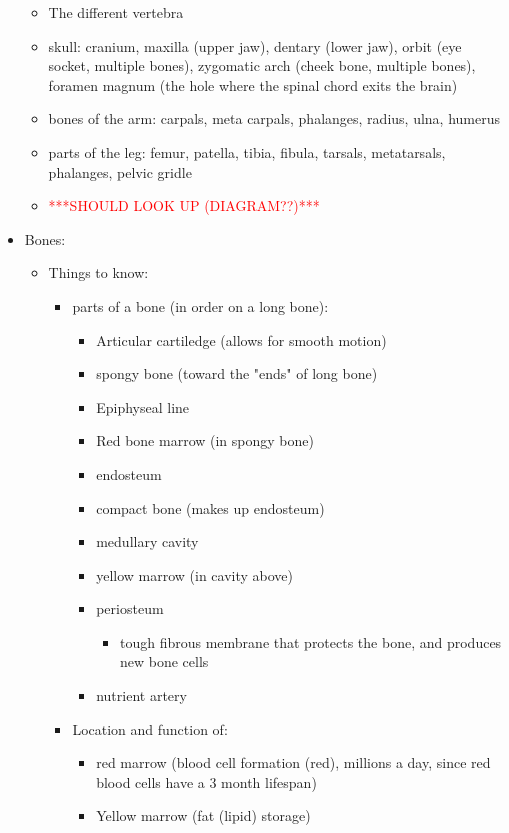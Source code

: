 \documentclass{article}
\theoremstyle{definition}
\begin{document}
\begin{itemize}
\begin{itemize}
			\item The different vertebra
			\item skull: cranium, maxilla (upper jaw), dentary (lower jaw), orbit (eye socket, multiple bones), zygomatic arch (cheek bone, multiple bones), foramen magnum (the hole where the spinal chord exits the brain)
			\item bones of the arm: carpals, meta carpals, phalanges, radius, ulna, humerus
			\item parts of the leg: femur, patella, tibia, fibula, tarsals, metatarsals, phalanges, pelvic gridle
			\item \textcolor{red}{***SHOULD LOOK UP (DIAGRAM??)***}
		\end{itemize}
	\item Bones:
		\begin{itemize}
			\item Things to know:
				\begin{itemize}
					\item parts of a bone (in order on a long bone):
						\begin{itemize}
							\item Articular cartiledge (allows for smooth motion)
							\item spongy bone (toward the "ends" of long bone)
							\item Epiphyseal line
							\item Red bone marrow (in spongy bone)
							\item endosteum
							\item compact bone (makes up endosteum)
							\item medullary cavity
							\item yellow marrow (in cavity above)
							\item periosteum
								\begin{itemize}
									\item tough fibrous membrane that protects the bone, and produces new bone cells
								\end{itemize}
							\item nutrient artery
						\end{itemize}
					\item Location and function of:
						\begin{itemize}
							\item red marrow (blood cell formation (red), millions a day, since red blood cells have a 3 month lifespan)
							\item Yellow marrow (fat (lipid) storage)

\end{itemize}
\end{itemize}
\end{itemize}
\end{itemize}
\end{document}
